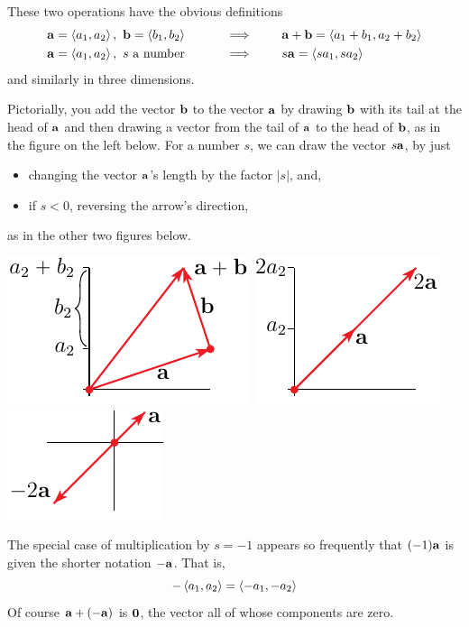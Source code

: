 \begin{defn}
             \label{def:addScalMult}
These two operations have the obvious definitions
\begin{alignat*}{2}
&\mathbf{a}=\left< a_1,a_2\right>,\ \mathbf{b} =\left< b_1,b_2\right>
             \qquad&&\implies\qquad\mathbf{a}+\mathbf{b}=\left< a_1+b_1,a_2+b_2\right>\\
&\mathbf{a}=\left< a_1,a_2\right>,\ s\text{ a number}
            \qquad&&\implies\qquad s\mathbf{a}=\left< sa_1,sa_2\right>
\end{alignat*}
and similarly in three dimensions.
\end{defn} 
Pictorially, you add the vector $\mathbf{b}$ to the vector $\mathbf{a}$ 
by drawing $\mathbf{b}$ with its tail at the head of $\mathbf{a}$ and then drawing
a vector from the tail of $\mathbf{a}$ to the head of $\mathbf{b}$, as in the figure
on the left below. For a number $s$, we can draw the vector $s\mathbf{a}$, by 
just 
\begin{itemize}\itemsep1pt \parskip0pt 
\item
changing the vector $\mathbf{a}$'s length by the factor $|s|$, and,
\item
if $s<0$, reversing the arrow's direction, 
\end{itemize}
as in the other two figures below.
\begin{wfig}
  \begin{center}
  \includegraphics{addvec.pdf}\qquad\qquad
  \includegraphics{scalmul.pdf}\qquad\qquad
  \includegraphics{negmul.pdf}
  \end{center}
\end{wfig}
The special case of multiplication by $s=-1$ appears so frequently that
$(-1)\mathbf{a}$ is given the shorter notation $-\mathbf{a}$. That is, 
\begin{equation*}
-\left< a_1,a_2\right>=\left< -a_1,-a_2\right>
\end{equation*}
Of course $\mathbf{a}+(-\mathbf{a})$ is $\mathbf{0}$, the vector all of whose components
are zero. 

